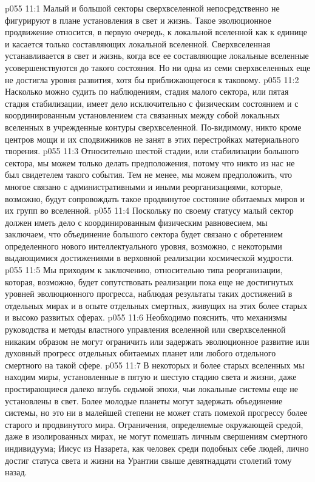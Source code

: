 \vs p055 11:1 Малый и большой секторы сверхвселенной непосредственно не фигурируют в плане установления в свет и жизнь. Такое эволюционное продвижение относится, в первую очередь, к локальной вселенной как к единице и касается только составляющих локальной вселенной. Сверхвселенная устанавливается в свет и жизнь, когда все ее составляющие локальные вселенные усовершенствуются до такого состояния. Но ни одна из семи сверхвселенных еще не достигла уровня развития, хотя бы приближающегося к таковому.
\vs p055 11:2 \pc {} Насколько можно судить по наблюдениям, стадия малого сектора, или пятая стадия стабилизации, имеет дело исключительно с физическим состоянием и с координированным установлением ста связанных между собой локальных вселенных в учрежденные контуры сверхвселенной. По\hyp{}видимому, никто кроме центров мощи и их сподвижников не занят в этих перестройках материального творения.
\vs p055 11:3 \pc {} Относительно шестой стадии, или стабилизации большого сектора, мы можем только делать предположения, потому что никто из нас не был свидетелем такого события. Тем не менее, мы можем предположить, что многое связано с административными и иными реорганизациями, которые, возможно, будут сопровождать такое продвинутое состояние обитаемых миров и их групп во вселенной.
\vs p055 11:4 Поскольку по своему статусу малый сектор должен иметь дело с координированным физическим равновесием, мы заключаем, что объединение большого сектора будет связано с обретением определенного нового интеллектуального уровня, возможно, с некоторыми выдающимися достижениями в верховной реализации космической мудрости.
\vs p055 11:5 \pc Мы приходим к заключению, относительно типа реорганизации, которая, возможно, будет сопутствовать реализации пока еще не достигнутых уровней эволюционного прогресса, наблюдая результаты таких достижений в отдельных мирах и в опыте отдельных смертных, живущих на этих более старых и высоко развитых сферах.
\vs p055 11:6 Необходимо пояснить, что механизмы руководства и методы властного управления вселенной или сверхвселенной никаким образом не могут ограничить или задержать эволюционное развитие или духовный прогресс отдельных обитаемых планет или любого отдельного смертного на такой сфере.
\vs p055 11:7 В некоторых и более старых вселенных мы находим миры, установленные в пятую и шестую стадию света и жизни, даже простирающиеся далеко вглубь седьмой эпохи, чьи локальные системы еще не установлены в свет. Более молодые планеты могут задержать объединение системы, но это ни в малейшей степени не может стать помехой прогрессу более старого и продвинутого мира. Ограничения, определяемые окружающей средой, даже в изолированных мирах, не могут помешать личным свершениям смертного индивидуума; Иисус из Назарета, как человек среди подобных себе людей, лично достиг статуса света и жизни на Урантии свыше девятнадцати столетий тому назад.
